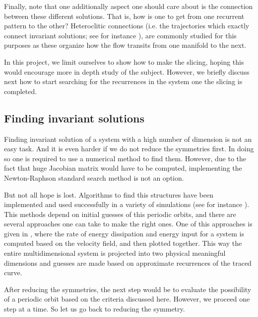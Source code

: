 Finally, note that one additionally aspect  one should care about is the
connection between these different solutions. That is, how is one to get
from one recurrent pattern to the other? Heteroclitic connections (i.e.
the trajectories which exactly connect invariant solutions; see for
instance ), are commonly studied for this purposes as
these organize how the flow transits from one manifold to the next.

In this project, we limit ourselves to show how to make the slicing,
hoping this would encourage more in depth study of the subject. However,
we briefly discuss next how to start searching for the recurrences in the
system one the slicing is completed.

\subsection{Finding invariant solutions}

Finding invariant solution of a system with a high number of dimension is
not an easy task. And it is even harder if we do not reduce the
symmetries first. In doing so one is required to use a numerical method
to find them. However, due to the fact that huge Jacobian matrix would
have to be computed, implementing the Newton-Raphson standard search
method is not an option.

But not all hope is lost. Algorithms to find this structures have been
implemented and used successfully in a variety of simulations (see for instance ). This
methods depend on initial guesses of this periodic orbits, and there are
several approaches one can take to make the right ones. One of this
approaches is given in , where the rate of energy
dissipation and energy input for a system is computed based on the
velocity field, and then plotted together. This way the entire
multidimensional system is projected into two physical meaningful
dimensions and guesses are made based on approximate recurrences of the
traced curve.

After reducing the symmetries, the next step would be to evaluate the
possibility of a periodic orbit based on the criteria discussed here.
However, we proceed one step at a time. So let us go back to reducing the
symmetry.


